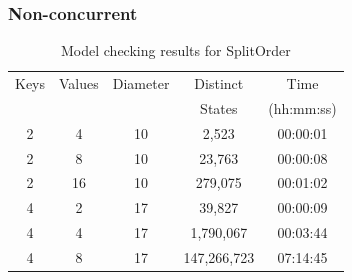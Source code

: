 \documentclass{beamer}
\begin{document}
\begin{frame}
  \frametitle{Non-concurrent}
\begin{table}[h]
    \centering
    \begin{tabular}{ |c|c||c|c|c| }
        \hline
        Keys & Values & Diameter & Distinct & Time \\
        &        &          & States   & (hh:mm:ss)\\
        \hline
        2 & 4  & 10 & 2,523      & 00:00:01\\
        2 & 8  & 10 & 23,763     & 00:00:08\\
        2 & 16 & 10 & 279,075    & 00:01:02\\
        4 & 2  & 17 & 39,827     & 00:00:09\\
        4 & 4  & 17 & 1,790,067  & 00:03:44\\
        4 & 8  & 17 & 147,266,723& 07:14:45\\
        \hline
    \end{tabular}
    \caption{Model checking results for SplitOrder}
    \label{tab:SplitOrder}
\end{table}
\end{frame}
\end{document}

